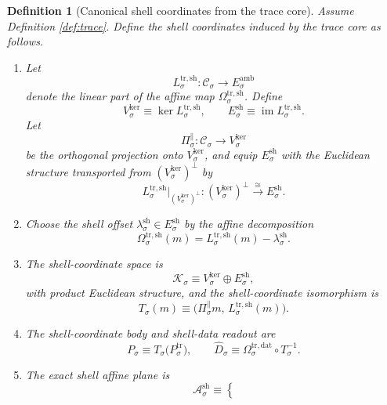 \documentclass[11pt]{article}
\newcommand{\AmbientTarget}[1]{E_{#1}^{\mathrm{amb}}}
\newcommand{\CoreState}[1]{\mathcal C_{#1}}
\newcommand{\TraceBody}[1]{P_{#1}^{\mathrm{tr}}}
\newcommand{\TraceDataMap}[1]{\Omega_{#1}^{\mathrm{tr,dat}}}
\newcommand{\TraceShellMap}[1]{\Omega_{#1}^{\mathrm{tr,sh}}}
\newcommand{\TraceShellLin}[1]{L_{#1}^{\mathrm{tr,sh}}}
\newcommand{\ShellKer}[1]{V_{#1}^{\mathrm{ker}}}
\newcommand{\ShellNormal}[1]{E_{#1}^{\mathrm{sh}}}
\newcommand{\ShellOffset}[1]{\lambda_{#1}^{\mathrm{sh}}}
\newcommand{\DirProj}[1]{\Pi_{#1}^{\parallel}}
\newcommand{\CoordSpace}[1]{\mathcal K_{#1}}
\newcommand{\CoordBody}[1]{P_{#1}}
\newcommand{\CoordIso}[1]{T_{#1}}
\newcommand{\AffineData}[1]{\widehat D_{#1}}
\newcommand{\ShellAffine}[1]{\mathcal A_{#1}^{\mathrm{sh}}}
\newtheorem{definition}{Definition}
\begin{document}
\begin{definition}[Canonical shell coordinates from the trace core]
\label{def:shell}
Assume Definition \ref{def:trace}. Define the shell coordinates induced by the trace core as follows.
\begin{enumerate}
    \item Let
    \[
    \TraceShellLin{\sigma}:\CoreState{\sigma}\to\AmbientTarget{\sigma}
    \]
    denote the linear part of the affine map \(\TraceShellMap{\sigma}\). Define
    \[
    \ShellKer{\sigma}\equiv\ker\TraceShellLin{\sigma},
    \qquad
    \ShellNormal{\sigma}\equiv\operatorname{im}\TraceShellLin{\sigma}.
    \]
    Let
    \[
    \DirProj{\sigma}:\CoreState{\sigma}\to\ShellKer{\sigma}
    \]
    be the orthogonal projection onto \(\ShellKer{\sigma}\), and equip \(\ShellNormal{\sigma}\) with the Euclidean structure transported from \((\ShellKer{\sigma})^{\perp}\) by
    \[
    \TraceShellLin{\sigma}\big|_{(\ShellKer{\sigma})^{\perp}}
    :
    (\ShellKer{\sigma})^{\perp}\xrightarrow{\cong}\ShellNormal{\sigma}.
    \]
    \item Choose the shell offset \(\ShellOffset{\sigma}\in\ShellNormal{\sigma}\) by the affine decomposition
    \begin{equation}
    \TraceShellMap{\sigma}(m)
    =
    \TraceShellLin{\sigma}(m)-\ShellOffset{\sigma}.
    \label{eq:traceshelldecomp}
    \end{equation}
    \item The shell-coordinate space is
    \[
    \CoordSpace{\sigma}\equiv
    \ShellKer{\sigma}\oplus\ShellNormal{\sigma},
    \]
    with product Euclidean structure, and the shell-coordinate isomorphism is
    \begin{equation}
    \CoordIso{\sigma}(m)
    \equiv
    \bigl(
    \DirProj{\sigma}m,\,
    \TraceShellLin{\sigma}(m)
    \bigr).
    \label{eq:tracecoordiso}
    \end{equation}
    \item The shell-coordinate body and shell-data readout are
    \begin{equation}
    \CoordBody{\sigma}
    \equiv
    \CoordIso{\sigma}\bigl(\TraceBody{\sigma}\bigr),
    \qquad
    \AffineData{\sigma}
    \equiv
    \TraceDataMap{\sigma}\circ\CoordIso{\sigma}^{-1}.
    \label{eq:tracecoordbody}
    \end{equation}
    \item The exact shell affine plane is
    \begin{equation}
    \ShellAffine{\sigma}
    \equiv
    \left\{

\end{equation}
\end{enumerate}
\end{definition}
\end{document}
